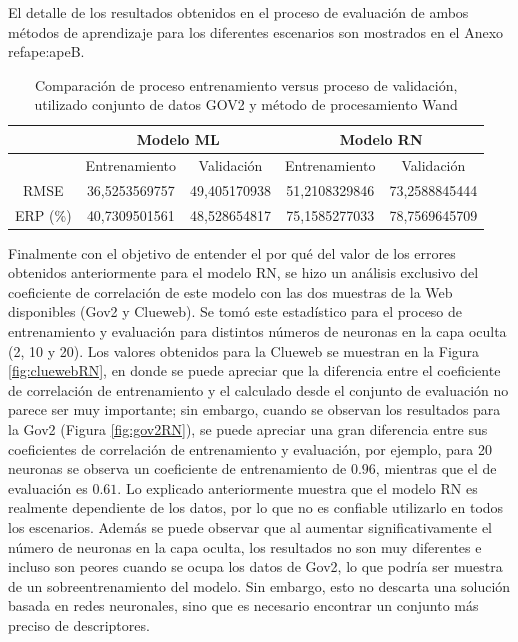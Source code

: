 El detalle de los resultados obtenidos en el proceso de evaluación de ambos métodos de aprendizaje para los diferentes escenarios son mostrados en el Anexo ref{ape:apeB}.

\begin{table}[tp]
\caption{Comparación de proceso entrenamiento versus proceso de validación, utilizado conjunto de datos GOV2 y método de procesamiento Wand}
\begin{center}
\begin{tabular}{|c|c|c|c|c|}
\hline
 & \multicolumn{ 2}{c|}{Modelo ML} & \multicolumn{ 2}{c|}{Modelo RN } \\ \hline
 & Entrenamiento & Validación & Entrenamiento & Validación \\ \hline
RMSE & 36,5253569757 & 49,405170938 & 51,2108329846 & 73,2588845444 \\ \hline
ERP (\%) & 40,7309501561 & 48,528654817 & 75,1585277033 & 78,7569645709 \\ \hline
\end{tabular}
\end{center}
\label{validacion_modelos_gov2_wand}
\end{table}

Finalmente con el objetivo de entender el por qué del valor de los errores obtenidos anteriormente para el modelo RN, se hizo un análisis exclusivo del coeficiente de correlación de este modelo con las dos muestras de la Web disponibles (Gov2 y Clueweb). Se tomó este estadístico para el proceso de entrenamiento y evaluación para distintos números de neuronas en la capa oculta (2, 10 y 20). Los valores obtenidos para la Clueweb se muestran en la Figura \ref{fig:cluewebRN}, en donde se puede apreciar que la diferencia entre el coeficiente de correlación de entrenamiento y el calculado desde el conjunto de evaluación no parece ser muy importante; sin embargo, cuando se observan los resultados para la Gov2 (Figura \ref{fig:gov2RN}), se puede apreciar una gran diferencia entre sus coeficientes de correlación de entrenamiento y evaluación, por ejemplo, para 20 neuronas se observa un coeficiente de entrenamiento de $0.96$, mientras que el de evaluación es $0.61$. Lo explicado anteriormente muestra que el modelo RN es realmente dependiente de los datos, por lo que no es confiable utilizarlo en todos los escenarios. Además se puede observar que al aumentar significativamente el número de neuronas en la capa oculta, los resultados no son muy diferentes e incluso son peores cuando se ocupa los datos de Gov2, lo que podría ser muestra de un sobreentrenamiento del modelo. Sin embargo, esto no descarta una solución basada en redes neuronales, sino que es necesario encontrar un conjunto más preciso de descriptores.

